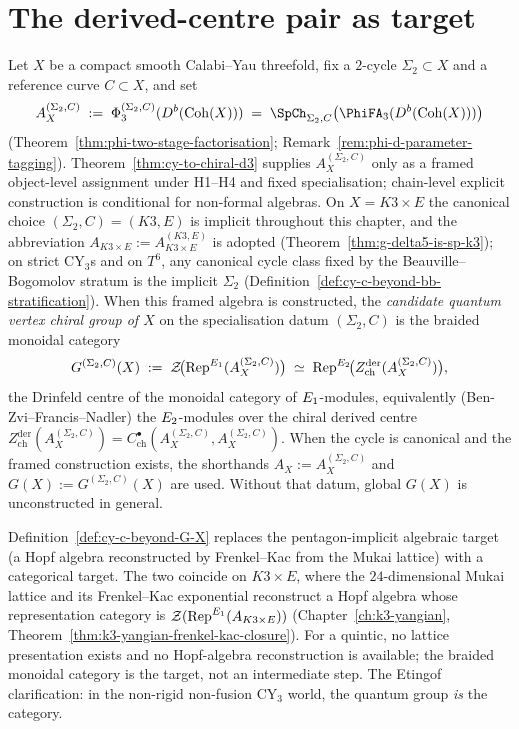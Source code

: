 \section{The derived-centre pair as target}
\label{sec:cy-c-beyond-centre-pair}

\begin{definition}
\label{def:cy-c-beyond-G-X}
Let $X$ be a compact smooth Calabi--Yau threefold, fix a $2$-cycle
$\Sigma_2 \subset X$ and a reference curve $C \subset X$, and set
\[
 A_X^{(\Sigma_2, C)} \;:=\; \Phi_3^{(\Sigma_2, C)}(D^b(\Coh(X)))
 \;=\; \SpCh_{\Sigma_2, C}\bigl(\PhiFA_3(D^b(\Coh(X)))\bigr)
\]
(Theorem~\ref{thm:phi-two-stage-factorisation};
Remark~\ref{rem:phi-d-parameter-tagging}). Theorem~\ref{thm:cy-to-chiral-d3}
supplies $A_X^{(\Sigma_2, C)}$ only as a framed object-level assignment under H1--H4
and fixed specialisation; chain-level explicit construction is conditional for non-formal algebras. On
$X = K3 \times E$ the canonical choice $(\Sigma_2, C) = (K3, E)$ is implicit
throughout this chapter, and the abbreviation
$A_{K3 \times E} := A_{K3 \times E}^{(K3, E)}$ is adopted
(Theorem~\ref{thm:g-delta5-is-sp-k3}); on strict CY$_3$s and on $T^6$, any
canonical cycle class fixed by the Beauville--Bogomolov stratum is the
implicit $\Sigma_2$ (Definition~\ref{def:cy-c-beyond-bb-stratification}).
When this framed algebra is constructed, the \emph{candidate quantum vertex chiral group of $X$} on the specialisation datum
$(\Sigma_2, C)$ is the braided monoidal category
\[
 G^{(\Sigma_2, C)}(X) \;:=\; \mathcal{Z}\!\bigl( \mathrm{Rep}^{E_{1}}(A_X^{(\Sigma_2, C)}) \bigr)
 \;\simeq\; \mathrm{Rep}^{E_{2}}\!\bigl( Z^{\mathrm{der}}_{\mathrm{ch}}(A_X^{(\Sigma_2, C)}) \bigr),
\]
the Drinfeld centre of the monoidal category of $E_{1}$-modules, equivalently
(Ben-Zvi--Francis--Nadler) the $E_{2}$-modules over the chiral derived centre
$Z^{\mathrm{der}}_{\mathrm{ch}}(A_X^{(\Sigma_2, C)})
= C^\bullet_{\mathrm{ch}}(A_X^{(\Sigma_2, C)}, A_X^{(\Sigma_2, C)})$. When
the cycle is canonical and the framed construction exists, the shorthands
$A_X := A_X^{(\Sigma_2, C)}$ and $G(X) := G^{(\Sigma_2, C)}(X)$ are used. Without that
datum, global $G(X)$ is unconstructed in general.
\end{definition}

\begin{remark}
\label{rem:cy-c-beyond-category-vs-algebra}
Definition~\ref{def:cy-c-beyond-G-X} replaces the pentagon-implicit algebraic target
(a Hopf algebra reconstructed by Frenkel--Kac from the Mukai lattice) with a categorical
target. The two coincide on $K3 \times E$, where the $24$-dimensional Mukai lattice and
its Frenkel--Kac exponential reconstruct a Hopf algebra whose representation category is
$\mathcal{Z}(\mathrm{Rep}^{E_{1}}(A_{K3 \times E}))$
(Chapter~\ref{ch:k3-yangian}, Theorem~\ref{thm:k3-yangian-frenkel-kac-closure}). For a
quintic, no lattice presentation exists and no Hopf-algebra reconstruction is available;
the braided monoidal category is the target, not an intermediate step. The Etingof
clarification: in the non-rigid non-fusion CY$_3$ world, the quantum group \emph{is} the
category.
\end{remark}

